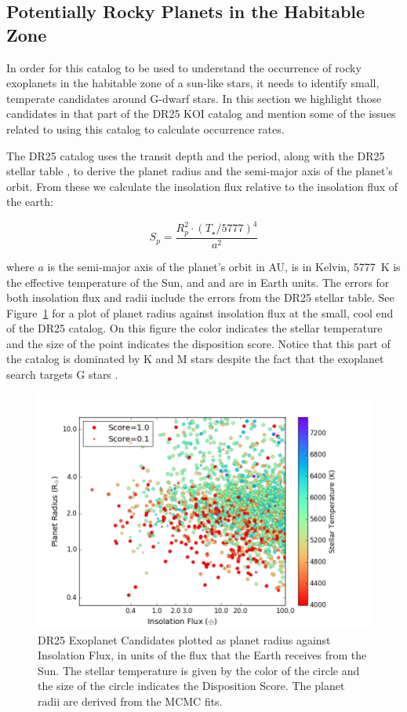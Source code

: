 \label{s:hz}
\subsection{Potentially Rocky Planets in the Habitable Zone}
In order for this catalog to be used to understand the occurrence of rocky exoplanets in the habitable zone of a sun-like stars, it needs to identify small, temperate candidates around G-dwarf stars.  In this section we highlight those candidates in that part of the DR25 KOI catalog and mention some of the issues related to using this catalog to calculate occurrence rates.

The DR25 catalog uses the transit depth and the period, along with the DR25 stellar table \citet{Mathur2017ApJS}, to derive the planet radius and the semi-major axis of the planet's orbit.  From these we calculate the insolation flux relative to the insolation flux of the earth:

\begin{equation}
S_{p} = \frac{R_{p}^{2} \cdot (T_{\star}/5777)^{4}}{a^{2}}
\end{equation}

\noindent where $a$ is the semi-major axis of the planet's orbit in AU, \tstar{} is in Kelvin, 5777~K is the effective temperature of the Sun, and \sp{} and \rp{} are in Earth units. The errors for both insolation flux and radii include the errors from the DR25 stellar table. See Figure~\ref{f:hzPlot} for a plot of planet radius against insolation flux at the small, cool end of the DR25 catalog. On this figure the color indicates the stellar temperature and the size of the point indicates the disposition score.  Notice that this part of the catalog is dominated by K and M stars despite the fact that the exoplanet search targets G stars \citet{Batalha2010}.

\begin{figure}
    \centering
    \includegraphics[width=1.1\linewidth]{fig-CatalogRadiusInsolScore.png}
    \caption{DR25 Exoplanet Candidates plotted as planet radius against Insolation Flux, in units of the flux that the Earth receives from the Sun. The stellar temperature is given by the color of the circle and the size of the circle indicates the Disposition Score. The planet radii are derived from the MCMC fits. }
    \label{f:hzPlot}
\end{figure}

